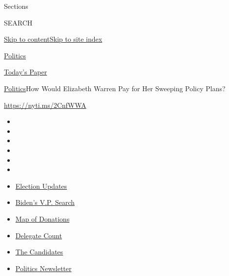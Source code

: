Sections

SEARCH

\protect\hyperlink{site-content}{Skip to
content}\protect\hyperlink{site-index}{Skip to site index}

\href{https://www.nytimes.com/section/politics}{Politics}

\href{https://myaccount.nytimes.com/auth/login?response_type=cookie\&client_id=vi}{}

\href{https://www.nytimes.com/section/todayspaper}{Today's Paper}

\href{/section/politics}{Politics}\textbar{}How Would Elizabeth Warren
Pay for Her Sweeping Policy Plans?

\url{https://nyti.ms/2CnfWWA}

\begin{itemize}
\item
\item
\item
\item
\item
\item
\end{itemize}

\begin{itemize}
\item
  \href{https://www.nytimes.com/2020/07/31/us/elections/biden-vs-trump.html?action=click\&pgtype=Article\&state=default\&region=TOP_BANNER\&context=storylines_menu}{Election
  Updates}
\item
  \href{https://www.nytimes.com/article/biden-vice-president-2020.html?action=click\&pgtype=Article\&state=default\&region=TOP_BANNER\&context=storylines_menu}{Biden's
  V.P. Search}
\item
  \href{https://www.nytimes.com/interactive/2020/07/24/us/politics/trump-biden-campaign-donors.html?action=click\&pgtype=Article\&state=default\&region=TOP_BANNER\&context=storylines_menu}{Map
  of Donations}
\item
  \href{https://www.nytimes.com/interactive/2020/us/elections/delegate-count-primary-results.html?action=click\&pgtype=Article\&state=default\&region=TOP_BANNER\&context=storylines_menu}{Delegate
  Count}
\item
  \href{https://www.nytimes.com/interactive/2019/us/politics/2020-presidential-candidates.html?action=click\&pgtype=Article\&state=default\&region=TOP_BANNER\&context=storylines_menu}{The
  Candidates}
\item
  \href{https://www.nytimes.com/newsletters/politics?action=click\&pgtype=Article\&state=default\&region=TOP_BANNER\&context=storylines_menu}{Politics
  Newsletter}
\end{itemize}

